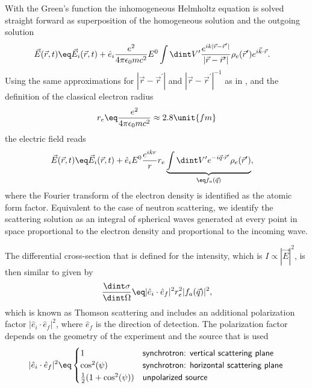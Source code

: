 \documentclass[\main/dresen_thesis.tex]{subfiles}
\begin{document}
    With the Green's function the inhomogeneous Helmholtz equation is solved straight forward as superposition of the homogeneous solution and the outgoing solution
    \begin{align}
      \vec{E} (\vec{r}, t) \eq& \vec{E}_i(\vec{r}, t) + \hat{e}_i \frac{e^2}{4\pi \epsilon_0 m c^2} E^0 \int \dint V^\prime \frac{e^{i k |\vec{r} - \vec{r}^\prime|}}{|\vec{r} - \vec{r}^\prime|} \rho_e (\vec{r}^\prime) e^{i\vec{k}\cdot \vec{r}}.
    \end{align}
    Using the same approximations for $|\vec{r} - \vec{r}^\prime|$ and $|\vec{r} - \vec{r}^\prime|^{-1}$ as in , and the definition of the classical electron radius
    \begin{align}
      r_e \eq \frac{e^2}{4\pi \epsilon_0 m c^2} \approx 2.8 \unit{fm}
    \end{align}
    the electric field reads
    \begin{align}
      \vec{E} (\vec{r}, t) \eq& \vec{E}_i(\vec{r}, t) + \hat{e}_i E^0   \frac{e^{ik r}}{r} r_e \underbrace{\int \dint V^\prime e^{-i \vec{q} \cdot  \vec{r}^\prime}  \rho_e (\vec{r}^\prime)}_{\eq f_a(\vec{q})},
    \end{align}
    where the Fourier transform of the electron density is identified as the atomic form factor.
    Equivalent to the case of neutron scattering, we identify the scattering solution as an integral of spherical waves generated at every point in space proportional to the electron density and proportional to the incoming wave.

    The differential cross-section that is defined for the intensity, which is $I \propto |\vec{E}|^2$, is then similar to  given by
    \begin{align}
      \frac{\dint \sigma}{\dint \Omega} \eq |\hat{e}_i \cdot \hat{e}_f|^2 r_e^2 |f_a(\vec{q})|^2,
    \end{align}
    which is known as Thomson scattering and includes an additional polarization factor $|\hat{e}_i \cdot \hat{e}_f|^2$, where $\hat{e}_f$ is the direction of detection.
    The polarization factor depends on the geometry of the experiment and the source that is used \cite{AlsNielsen_2011_Eleme}
    \begin{align}
      |\hat{e}_i \cdot \hat{e}_f|^2 \eq \begin{cases}
        1 & \textsf{synchrotron: vertical scattering plane} \\
        \cos^2(\psi) & \textsf{synchrotron: horizontal scattering plane}\\
        \frac{1}{2} (1+\cos^2(\psi)) & \textsf{unpolarized source}
      \end{cases}
    \end{align}
\end{document}
